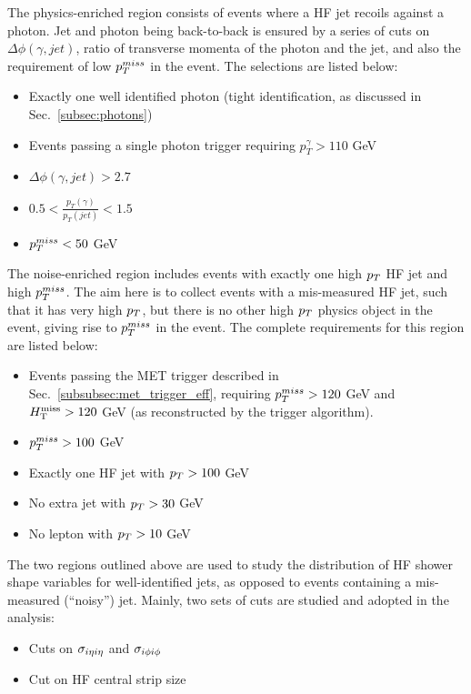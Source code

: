 The physics-enriched region consists of events where a HF jet recoils against a photon. 
Jet and photon being back-to-back is ensured by a series of cuts on $\Delta\phi(\gamma, jet)$,
ratio of transverse momenta of the photon and the jet, and also the requirement of low $p_T^{miss}$ in the event. The selections are listed below: 

\begin{itemize}
    \item Exactly one well identified photon (tight identification, as discussed in Sec.~\ref{subsec:photons})
    \item Events passing a single photon trigger requiring $p_T^{\gamma} > 110$ GeV
    \item $\Delta\phi(\gamma, jet) > 2.7$
    \item $0.5 < \frac{p_T(\gamma)}{p_T(jet)} < 1.5$
    \item $p_T^{miss} < 50$ GeV
\end{itemize}

The noise-enriched region includes events with exactly one high $p_T$ HF jet and high $p_T^{miss}$.
The aim here is to collect events with a mis-measured HF jet, such that it has very high $p_T$, but there is no other high $p_T$ physics object in the event,
giving rise to $p_T^{miss}$ in the event.
The complete requirements for this region are listed below:

\begin{itemize}
    \item Events passing the MET trigger described in Sec.~\ref{subsubsec:met_trigger_eff}, requiring $p_T^{miss} > 120$ GeV and $H_{\mathrm{T}}^{\mathrm{miss}} > 120$ GeV
    (as reconstructed by the trigger algorithm). 
    \item $p_T^{miss} > 100$ GeV
    \item Exactly one HF jet with $p_T > 100$ GeV
    \item No extra jet with $p_T > 30$ GeV
    \item No lepton with $p_T > 10$ GeV
\end{itemize}

The two regions outlined above are used to study the distribution of HF shower shape variables for well-identified jets, as opposed to events
containing a mis-measured (``noisy'') jet. Mainly, two sets of cuts are studied and adopted in the analysis:

\begin{itemize}
    \item Cuts on $\sigma_{i\eta i\eta}$ and $\sigma_{i\phi i\phi}$
    \item Cut on HF central strip size
\end{itemize}

